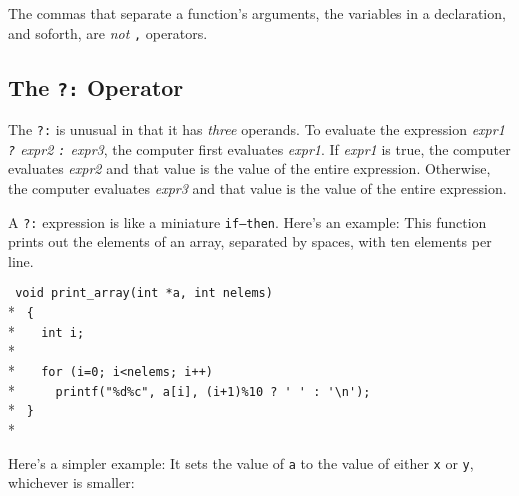 \begin{flushleft}
\verb% void strrev(char *s)% \\*
\verb% {% \\*
\verb%   int c, i, j;% \\*
\verb% % \\*
\verb%   for (i=0, j=strlen(s)-1;  i<j;  i++, j++) {% \\*
\verb%     c = s[i];% \\*
\verb%     s[i] = s[j];% \\*
\verb%     s[j] = c;% \\*
\verb%   }% \\*
\verb% }% \\*
\end{flushleft}

The commas that separate a function's arguments, the variables in a
declaration, and soforth, are {\em not}\/ {\tt ,} operators.

\subsection{The {\tt ?:} Operator}

The {\tt ?:} is unusual in that it has {\em three}\/ operands.  To
evaluate the expression {\em expr1 {\tt ?} expr2 {\tt :} expr3}\/, the
computer first evaluates {\em expr1}\/.  If {\em expr1} is true, the
computer evaluates {\em expr2}\/ and that value is the value of the
entire expression.  Otherwise, the computer evaluates {\em expr3}\/ and
that value is the value of the entire expression.

A {\tt ?:} expression is like a miniature {\tt if{\rm --}then}.  Here's
an example:  This function prints out the elements of an array,
separated by spaces, with ten elements per line.

\begin{flushleft}
\verb! void print_array(int *a, int nelems) ! \\*
\verb! { ! \\*
\verb!   int i; ! \\*
\verb!  ! \\*
\verb!   for (i=0; i<nelems; i++)  ! \\*
\verb!     printf("%d%c", a[i], (i+1)%10 ? ' ' : '\n'); ! \\*
\verb! } ! \\*
\end{flushleft}

Here's a simpler example:  It sets the value of {\tt a} to the value of
either {\tt x} or {\tt y}, whichever is smaller:


